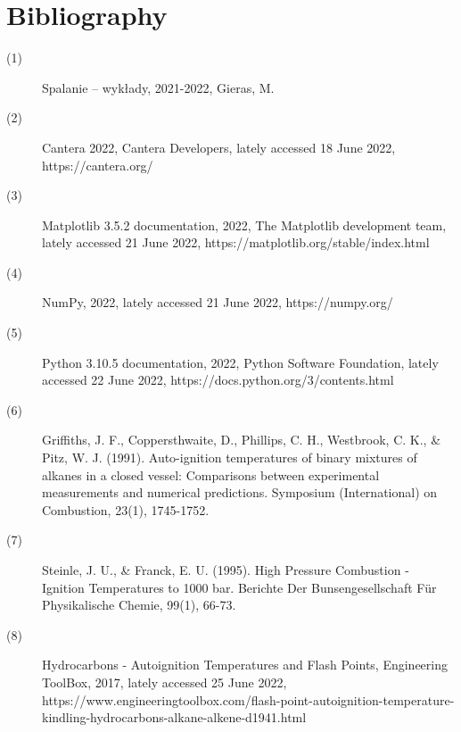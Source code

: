 		\section{Bibliography}
		\begin{description}
			\item[(1)] Spalanie – wykłady, 2021-2022, Gieras, M.
			\item[(2)] Cantera  2022, Cantera Developers, lately accessed 18 June 2022, \\ \textlangle https://cantera.org/\textrangle
			\item[(3)] Matplotlib 3.5.2 documentation, 2022,  The Matplotlib development team, lately accessed 21 June 2022, \textlangle https://matplotlib.org/stable/index.html\textrangle
			\item[(4)] NumPy, 2022, lately accessed 21 June 2022, \textlangle https://numpy.org/ \textrangle
			\item[(5)] Python 3.10.5 documentation, 2022, Python Software Foundation, lately accessed 22 June 2022, \textlangle https://docs.python.org/3/contents.html\textrangle
			\item[(6)] Griffiths, J. F., Coppersthwaite, D., Phillips, C. H., Westbrook, C. K., \& Pitz, W. J. (1991). Auto-ignition temperatures of binary mixtures of alkanes in a closed vessel: Comparisons between experimental measurements and numerical predictions. Symposium (International) on Combustion, 23(1), 1745-1752.
			\item[(7)] Steinle, J. U., \& Franck, E. U. (1995). High Pressure Combustion - Ignition Temperatures to 1000 bar. Berichte Der Bunsengesellschaft Für Physikalische Chemie, 99(1), 66-73.
			\item[(8)] Hydrocarbons - Autoignition Temperatures and Flash Points, Engineering ToolBox, 2017, lately accessed 25 June 2022, \\ \textlangle https://www.engineeringtoolbox.com/flash-point-autoignition-temperature-kindling-hydrocarbons-alkane-alkene-d\textunderscore1941.html\textrangle
		\end{description}
		
		
		
		
	